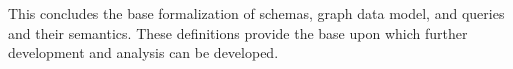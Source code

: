 


This concludes the base formalization of \gql schemas, graph data model, and queries and their semantics.  These definitions provide the base upon which further development and analysis can be developed.

